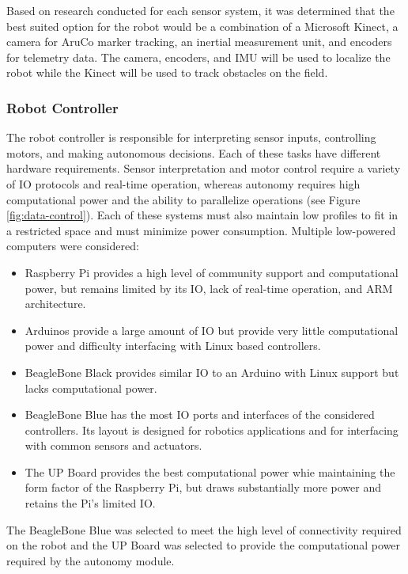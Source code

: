 \documentclass[class=article, crop=false]{standalone}
\begin{document}
	Based on research conducted for each sensor system, it was determined that the best suited option for the robot would be a combination of a Microsoft Kinect, a camera for AruCo marker tracking, an inertial measurement unit, and encoders for telemetry data. The camera, encoders, and IMU will be used to localize the robot while the Kinect will  be used to track obstacles on the field.
	
	\subsubsection{Robot Controller}
	
	The robot controller is responsible for interpreting sensor inputs, controlling motors, and making autonomous decisions. Each of these tasks have  different hardware requirements. Sensor interpretation and motor control require a variety of IO protocols and real-time operation, whereas autonomy requires high computational power and the ability to parallelize operations (see Figure \ref{fig:data-control}). Each of these systems must also maintain low profiles to fit in a restricted space and must minimize power consumption. Multiple low-powered computers were considered:
	\begin{itemize}
	 \item Raspberry Pi provides a high level of community support and computational power, but remains limited by its IO, lack of real-time operation, and ARM architecture.
	 \item Arduinos provide a large amount of IO but provide very little computational power and difficulty interfacing with Linux based controllers.
	 \item BeagleBone Black provides similar IO to an Arduino with Linux support but lacks computational power.
	 \item BeagleBone Blue has the most IO ports and interfaces of the considered controllers. Its layout is designed for robotics applications and for interfacing with common sensors and actuators. 
	 \item The UP Board provides the best computational power whie maintaining the form factor of the Raspberry Pi, but draws substantially more power and retains the Pi’s limited IO.
	\end{itemize}
	
	The BeagleBone Blue was selected to meet the high level of connectivity required on the robot and the UP Board was selected to provide the computational power required by the autonomy module.
	
\end{document}
